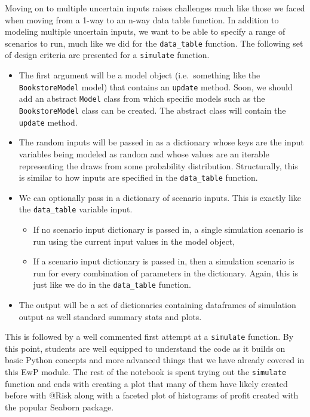 \documentclass[ited,blindrev]{informs3}              %
\newcommand{\code}[1]{\texttt{#1}}
\begin{document}
Moving on to multiple uncertain inputs raises challenges much like those we faced when moving from a 1-way to an n-way data table function. In addition to modeling multiple uncertain inputs, we want to be able to specify a range of scenarios to run, much like we did for the \code{data_table} function. The following set of design criteria are presented for a \code{simulate} function.

\begin{itemize}
	\tightlist
	\item
	The first argument will be a model object (i.e.~something like the
	\texttt{BookstoreModel} model) that contains an \texttt{update}
	method. Soon, we should add an abstract \texttt{Model} class from
	which specific models such as the \texttt{BookstoreModel} class can be
	created. The abstract class will contain the \texttt{update} method.
	\item
	The random inputs will be passed in as a dictionary whose keys are the
	input variables being modeled as random and whose values are an
	iterable representing the draws from some probability distribution.
	Structurally, this is similar to how inputs are specified in the
	\texttt{data\_table} function.
	\item
	We can optionally pass in a dictionary of scenario inputs. This is
	exactly like the \texttt{data\_table} variable input.
	
	\begin{itemize}
		\tightlist
		\item
		If no scenario input dictionary is passed in, a single simulation
		scenario is run using the current input values in the model object,
		\item
		If a scenario input dictionary is passed in, then a simulation
		scenario is run for every combination of parameters in the
		dictionary. Again, this is just like we do in the
		\texttt{data\_table} function.
	\end{itemize}
	\item
	The output will be a set of dictionaries containing dataframes of
	simulation output as well standard summary stats and plots.
\end{itemize}

This is followed by a well commented first attempt at a \code{simulate} function. By this point, students are well equipped to understand the code as it builds on basic Python concepts and more advanced things that we have already covered in this EwP module. The rest of the notebook is spent trying out the \code{simulate} function and ends with creating a plot that many of them have likely created before with @Risk along with a faceted plot of histograms of profit created with the popular Seaborn package.
\end{document}
